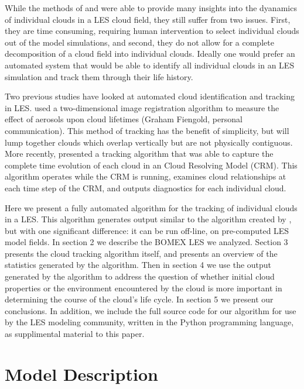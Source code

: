 \documentclass[acp]{copernicus}
\begin{document}
While the methods of \citeauthor{Zhao2005} and \citeauthor{Heus2009} were 
able to provide many insights into the dyanamics of individual clouds in a 
LES cloud field, they still suffer from two issues.  First, they are time 
consuming, requiring human intervention to select individual clouds out of 
the model simulations, and second, they do not allow for a complete 
decomposition of a cloud field into individual clouds.  Ideally one would 
prefer an automated system that would be able to identify all individual clouds 
in an LES simulation and track them through their life history.

Two previous studies have looked at automated cloud identification and tracking 
in LES. \cite{Jiang2006} used a two-dimensional image registration algorithm 
to measure the effect of aerosols upon cloud lifetimes (Graham Fiengold, 
personal communication).  This method of tracking has the benefit of 
simplicity, but will lump together clouds which overlap vertically but are not 
physically contiguous.  More recently, \cite{Plant2009} presented a tracking 
algorithm that was able to capture the complete time evolution of each cloud in 
an Cloud Resolving Model (CRM). This algorithm operates while the CRM is 
running, examines cloud relationships at each time step of the CRM, and outputs 
diagnostics for each individual cloud.

Here we present a fully automated algorithm for the tracking of individual 
clouds in a LES. This algorithm generates output similar to the algorithm 
created by \cite{Plant2009}, but with one significant difference: it can be 
run off-line, on pre-computed LES model fields.  In section 2 we describe the 
BOMEX LES we analyzed.  Section 3 presents the cloud tracking algorithm itself, 
and presents an overview of the statistics generated by the algorithm.  Then in 
section 4 we use the output generated by the algorithm to address the question 
of whether initial cloud properties or the environment encountered by the cloud 
is more important in determining the course of the cloud's life cycle.  
In section 5 we present our conclusions.  In addition, we include the full 
source code for our algorithm for use by the LES modeling community, written in 
the Python programming language, as supplimental material to this paper.


\section{Model Description}
\end{document}
